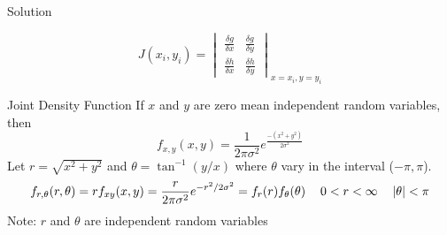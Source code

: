 \documentclass{beamer}
\begin{document}
\begin{frame}{Solution}
    \begin{alertblock}{}
        \begin{equation}
            J(x_i,y_i)= \begin{vmatrix}
                \frac{\delta g}{\delta x} & \frac{\delta g}{\delta y} \\ \frac{\delta h}{\delta x} & \frac{\delta h}{\delta y}
            \end{vmatrix}_{x=x_i,y=y_i}
        \end{equation}
    \end{alertblock}
    \begin{alertblock}{Joint Density Function}
        If $x$ and $y$ are zero mean independent random variables, then
        \begin{equation}
            f_{x,y}(x,y) = \frac{1}{2\pi \sigma^2} e^{\frac{-(x^2+y^2)}{2\sigma^2}}
        \end{equation}
        Let $r=\sqrt{x^2+y^2}$ and $\theta = \tan ^{-1}(y/x)$ where $\theta$ vary in the interval ($-\pi,\pi$).
        \begin{equation}
            f_{r,\theta}(r,\theta) = rf_{xy}(x,y) = \frac{r}{2\pi \sigma^2}e^{-r^2/2\sigma^2}=f_r(r)f_\theta(\theta) \hspace*{12pt} 0 < r < \infty \hspace*{12pt} |\theta| < \pi \label{eq:7}
        \end{equation}
        Note: $r$ and $\theta$ are independent random variables
    \end{alertblock}
\end{frame}
\end{document}
